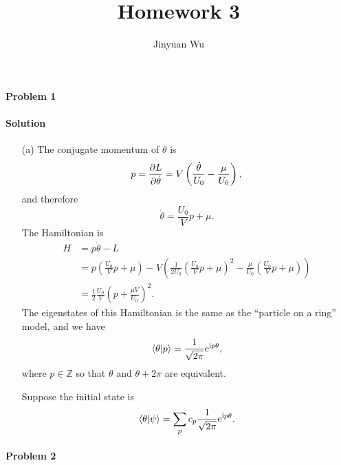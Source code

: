 \documentclass[hyperref, a4paper]{article}
\title{Homework 3}
\author{Jinyuan Wu}
\newcommand*{\ii}{\mathrm{i}}
\newcommand*{\ee}{\mathrm{e}}
\begin{document}
\maketitle

\paragraph{Problem 1} 

\paragraph{Solution} \begin{itemize}
\item[(a)] The conjugate momentum of $\theta$ is 
\begin{equation}
    p = \pdv{L}{\dot{\theta}}
    = V \left( \frac{\dot{\theta}}{U_0} - \frac{\mu}{U_0} \right),
\end{equation}
and therefore 
\begin{equation}
    \dot{\theta} = \frac{U_0}{V} p + \mu.
\end{equation}
The Hamiltonian is 
\begin{equation}
    \begin{aligned}
        H &= p \dot{\theta} - L \\
        &= p \left( \frac{U_0}{V} p + \mu \right) - 
        V \left( 
            \frac{1}{2U_0} \left( \frac{U_0}{V} p + \mu \right)^2 
            - \frac{\mu}{U_0} \left( \frac{U_0}{V} p + \mu \right) 
        \right) \\ 
        &= \frac{1}{2} \frac{U_0}{V} \left( p + \frac{\mu V}{U_0} \right)^2.
    \end{aligned}
\end{equation}
The eigenstates of this Hamiltonian is the same as the ``particle on a ring'' model, and we have 
\begin{equation}
    \braket{\theta}{p} = \frac{1}{\sqrt{2\pi}} \ee^{\ii p \theta},
\end{equation}
where $p \in \mathbb{Z}$ so that $\theta$ and $\theta + 2\pi$ are equivalent.

Suppose the initial state is 
\begin{equation}
    \braket{\theta}{\psi} = \sum_p c_p \frac{1}{\sqrt{2\pi}} \ee^{\ii p \theta}.
\end{equation}


\end{itemize}

\paragraph{Problem 2} 
\end{document}
